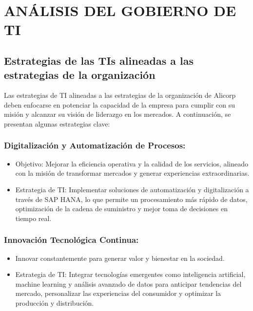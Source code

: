 \section{ANÁLISIS DEL GOBIERNO DE TI}

\subsection{Estrategias de las TIs alineadas a las estrategias de la organización}
Las estrategias de TI alineadas a las estrategias de la organización de Alicorp deben enfocarse en potenciar la capacidad de la empresa para cumplir con su misión y alcanzar su visión de liderazgo en los mercados. A continuación, se presentan algunas estrategias clave:

    \subsubsection*{Digitalización y Automatización de Procesos:}
        \begin{itemize}
            \item Objetivo: Mejorar la eficiencia operativa y la calidad de los servicios, alineado con la misión de transformar mercados y generar experiencias extraordinarias.
            \item Estrategia de TI: Implementar soluciones de automatización y digitalización a través de SAP HANA, lo que permite un procesamiento más rápido de datos, optimización de la cadena de suministro y mejor toma de decisiones en tiempo real.
        \end{itemize}
    \subsubsection*{Innovación Tecnológica Continua:}
        \begin{itemize}
            \item Innovar constantemente para generar valor y bienestar en la sociedad.
            \item Estrategia de TI: Integrar tecnologías emergentes como inteligencia artificial, machine learning y análisis avanzado de datos para anticipar tendencias del mercado, personalizar las experiencias del consumidor y optimizar la producción y distribución.
        \end{itemize}

